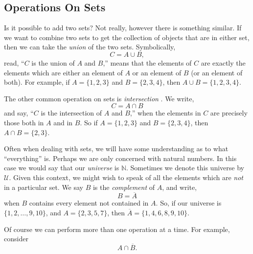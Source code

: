 \documentclass[10pt,]{memoir}
\theoremstyle{plain}
\theoremstyle{definition}
\theoremstyle{definition}
\theoremstyle{definition}
\numberwithin{equation}{chapter}
\def\N{\mathbb N}
\def\U{\mathcal U}
\renewcommand{\bar}{\overline}
\begin{document}
\subsection[Operations On Sets]{Operations On Sets}\label{subsection-6}

      Is it possible to add two sets? Not really, however there is something similar. If we want to combine two sets to get the collection of objects that are in either set, then we can take the \emph{union}
       of the two sets. Symbolically,
      \begin{equation*}
        C = A \cup B,
      \end{equation*}
      read, ``\(C\) is the union of \(A\) and \(B\),'' means that the elements of \(C\) are exactly the elements which are either an element of \(A\) or an element of \(B\) (or an element of both). For example, if \(A = \{1, 2, 3\}\) and \(B = \{2, 3, 4\}\), then \(A \cup B = \{1, 2, 3, 4\}\).
\par

      The other common operation on sets is \emph{intersection}
      . We write,
      \begin{equation*}
        C = A \cap B
      \end{equation*}
      and say, ``\(C\) is the intersection of \(A\) and \(B\),'' when the elements in \(C\) are precisely those both in \(A\) and in \(B\). So if \(A = \{1, 2, 3\}\) and \(B = \{2, 3, 4\}\), then \(A \cap B = \{2, 3\}\).
\par

      Often when dealing with sets, we will have some understanding as to what ``everything'' is. Perhaps we are only concerned with natural numbers. In this case we would say that our \emph{universe} is \(\N\). Sometimes we denote this universe by \(\U\). Given this context, we might wish to speak of all the elements which are \emph{not} in a particular set. We say \(B\) is the \emph{complement}
       of \(A\), and write,
      \begin{equation*}
        B = \bar A
      \end{equation*}
      when \(B\) contains every element not contained in \(A\). So, if our universe is \(\{1, 2,\ldots, 9, 10\}\), and \(A = \{2, 3, 5, 7\}\), then \(\bar A = \{1, 4, 6, 8, 9,10\}\).
\par

      Of course we can perform more than one operation at a time. For example, consider
      \begin{equation*}
        A \cap \bar B.
      \end{equation*}
\par
\end{document}

